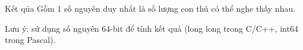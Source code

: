 Kết qủa
Gồm 1 số nguyên duy nhất là số lượng con thú có thể nghe thấy nhau.  

   Lưu ý: sử dụng số nguyên 64-bit để tính kết quả (long long trong C/C++, int64 trong Pascal).